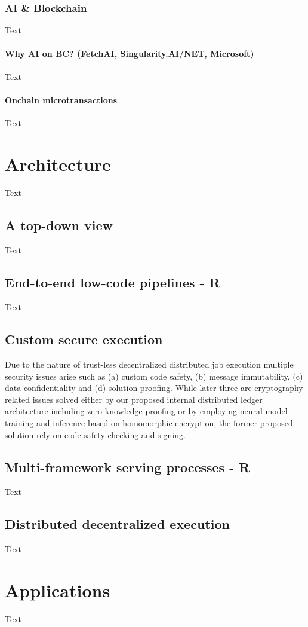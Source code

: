 \documentclass{article}
\begin{document}
\subsubsection{AI \& Blockchain}
Text
\paragraph{Why AI on BC? (FetchAI, Singularity.AI/NET, Microsoft)}
Text
\paragraph{Onchain microtransactions}
Text
\section{Architecture}
Text
\subsection{A top-down view}
Text
\subsection{End-to-end low-code pipelines - R}
Text
\subsection{Custom secure execution}

Due to the nature of trust-less decentralized distributed job execution multiple security issues arise such as (a) custom code safety, (b) message immutability, (c) data confidentiality and (d) solution proofing. While later three are cryptography related issues solved either by our proposed internal distributed ledger architecture including zero-knowledge proofing or by employing neural model training and inference based on homomorphic encryption, the former proposed solution rely on code safety checking and signing.

\subsection{Multi-framework serving processes - R}
Text
\subsection{Distributed decentralized execution}
Text

\section{Applications}
Text
\end{document}
